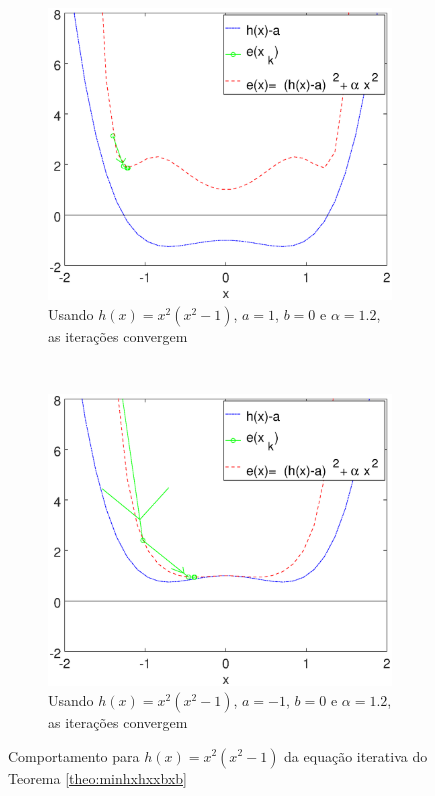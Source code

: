 \begin{figure}[!h]
    \centering
    \begin{subfigure}[b]{0.45\textwidth}
        \includegraphics[width=\textwidth]{chapters/minimization-hx/mfiles/hx_a_alphax/minimizando_hx_a_alphax_1.eps}
        \caption{Usando $h(x)=x^2(x^2-1)$, $a=1$, $b=0$ e $\alpha=1.2$, as iterações convergem}
        \label{fig:hxbcasesa}
    \end{subfigure}
    ~ %
    \begin{subfigure}[b]{0.45\textwidth}
        \includegraphics[width=\textwidth]{chapters/minimization-hx/mfiles/hx_a_alphax/minimizando_hx_a_alphax_2.eps}
        \caption{Usando $h(x)=x^2(x^2-1)$, $a=-1$, $b=0$ e $\alpha=1.2$, as iterações convergem}
        \label{fig:hxbcasesb}
    \end{subfigure}
    \caption{Comportamento para $h(x)=x^2(x^2-1)$ da equação iterativa do Teorema \ref{theo:minhxhxxbxb}}
    \label{fig:hxbcases}
\end{figure}



